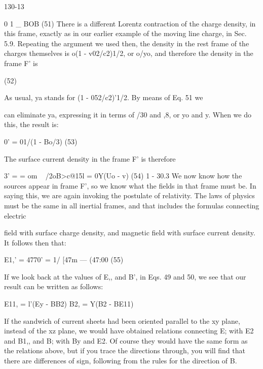 130-13

0 1 _ BOB (51)
There is a different Lorentz contraction of the charge density, in this
frame, exactly as in our earlier example of the moving line charge,
in Sec. 5.9. Repeating the argument we used then, the density in
the rest frame of the charges themselves is o(1 - v02/c2)1/2, or o/yo,
and therefore the density in the frame F' is

\begin{equation}
\end{equation}
(52)

As usual, ya stands for (1 - 052/c2)'1/2. By means of Eq. 51 we

can eliminate ya, expressing it in terms of /30 and ,8, or yo and y.
When we do this, the result is:

\begin{equation}
\end{equation}
0' = 01/(1 - Bo/3) (53)

The surface current density in the frame F' is therefore

\begin{equation}
\end{equation}
3' =  = om ~ /2oB>c@15l = 0Y(Uo - v) (54)
1 - 30.3
We now know how the sources appear in frame F', so we know what
the fields in that frame must be. In saying this, we are again invoking
the postulate of relativity. The laws of physics must be the same in
all inertial frames, and that includes the formulas connecting electric

field with surface charge density, and magnetic field with surface
current density. It follows then that:

\begin{equation}
\end{equation}
E1,' = 4770' = 1/ [47m --- (47:00  (55)
 

If we look back at the values of E,, and B', in Eqs. 49 and 50, we see
that our result can be written as follows:

\begin{equation}
\end{equation}
E11, = l'(Ey - BB2)
B2, = Y(B2 - BE11)

If the sandwich of current sheets had been oriented parallel to the
xy plane, instead of the xz plane, we would have obtained relations
connecting E; with E2 and B1,, and B; with By and E2. Of course they
would have the same form as the relations above, but if you trace
the directions through, you will find that there are differences of sign,
following from the rules for the direction of B.


